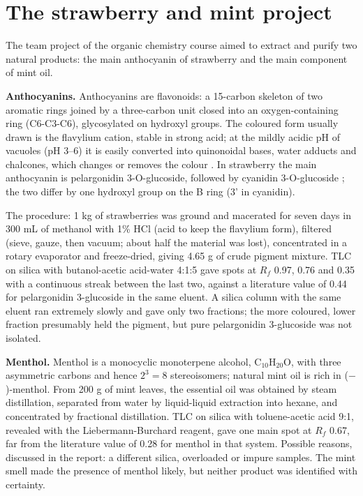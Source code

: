 \section{The strawberry and mint project}
\label{section-chem-project}

The team project of the organic chemistry
course aimed to extract and purify two
natural products: the main anthocyanin of
strawberry and the main component of mint
oil.

\textbf{Anthocyanins.}
Anthocyanins are flavonoids: a 15-carbon
skeleton of two aromatic rings joined by a
three-carbon unit closed into an
oxygen-containing ring (C6-C3-C6),
glycosylated on hydroxyl groups. The coloured
form usually drawn is the flavylium cation,
stable in strong acid; at the mildly acidic
pH of vacuoles (pH 3--6) it is easily
converted into quinonoidal bases, water
adducts and chalcones, which changes or
removes the colour \cite[Chapter
3]{gould2009anthocyanins}. In strawberry the
main anthocyanin is pelargonidin
3-O-glucoside, followed by cyanidin
3-O-glucoside \cite[Section
5.4]{gould2009anthocyanins}; the two differ
by one hydroxyl group on the B ring (3' in
cyanidin).

The procedure: 1 kg of strawberries was
ground and macerated for seven days in 300 mL
of methanol with 1\% HCl (acid to keep the
flavylium form), filtered (sieve, gauze, then
vacuum; about half the material was lost),
concentrated in a rotary evaporator and
freeze-dried, giving 4.65 g of crude pigment
mixture. TLC on silica with butanol-acetic
acid-water 4:1:5 gave spots at $R_f$ 0.97,
0.76 and 0.35 with a continuous streak
between the last two, against a literature
value of 0.44 for pelargonidin 3-glucoside in
the same eluent. A silica column with the
same eluent ran extremely slowly and gave
only two fractions; the more coloured, lower
fraction presumably held the pigment, but
pure pelargonidin 3-glucoside was not
isolated.

\textbf{Menthol.}
Menthol is a monocyclic monoterpene alcohol,
$\mathrm{C_{10}H_{20}O}$, with three
asymmetric carbons and hence $2^3 = 8$
stereoisomers; natural mint oil is rich in
($-$)-menthol. From 200 g of mint leaves, the
essential oil was obtained by steam
distillation, separated from water by
liquid-liquid extraction into hexane, and
concentrated by fractional distillation. TLC
on silica with toluene-acetic acid 9:1,
revealed with the Liebermann-Burchard
reagent, gave one main spot at $R_f$ 0.67,
far from the literature value of 0.28 for
menthol in that system. Possible reasons,
discussed in the report: a different silica,
overloaded or impure samples. The mint smell
made the presence of menthol likely, but
neither product was identified with
certainty.





